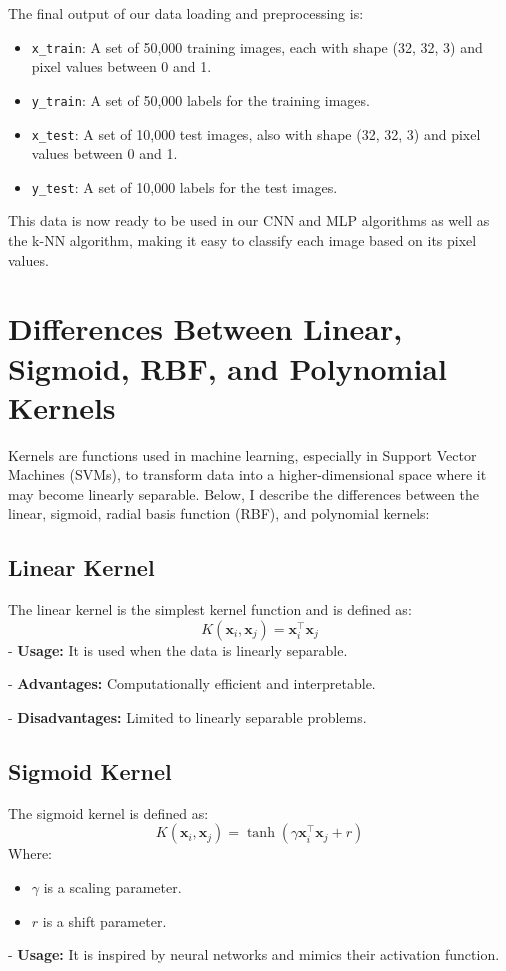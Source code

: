 \documentclass[lettersize,journal]{IEEEtran}
\begin{document}
The final output of our data loading and preprocessing is:
\begin{itemize}
    \item \texttt{x\_train}: A set of 50,000 training images, each with shape (32, 32, 3) and pixel values between 0 and 1.
    \item \texttt{y\_train}: A set of 50,000 labels for the training images.
    \item \texttt{x\_test}: A set of 10,000 test images, also with shape (32, 32, 3) and pixel values between 0 and 1.
    \item \texttt{y\_test}: A set of 10,000 labels for the test images.
\end{itemize}
\vspace{0.3cm}
This data is now ready to be used in our CNN and MLP algorithms as well as the k-NN algorithm, making it easy to classify each image based on its pixel values.

\section{\textbf{Differences Between Linear, Sigmoid, RBF, and Polynomial Kernels}}

Kernels are functions used in machine learning, especially in Support Vector Machines (SVMs), to transform data into a higher-dimensional space where it may become linearly separable. Below, I describe the differences between the linear, sigmoid, radial basis function (RBF), and polynomial kernels:

\subsection{\textbf{Linear Kernel}}
The linear kernel is the simplest kernel function and is defined as:
\[
K(\mathbf{x}_i, \mathbf{x}_j) = \mathbf{x}_i^\top \mathbf{x}_j
\]
- \textbf{Usage:} It is used when the data is linearly separable.

\vspace{0.1cm}

\hspace{-0.33cm}- \textbf{Advantages:} Computationally efficient and interpretable.

\vspace{0.1cm}

\hspace{-0.33cm}- \textbf{Disadvantages:} Limited to linearly separable problems.

\subsection{\textbf{Sigmoid Kernel}}
The sigmoid kernel is defined as:
\[
K(\mathbf{x}_i, \mathbf{x}_j) = \tanh(\gamma \mathbf{x}_i^\top \mathbf{x}_j + r)
\]
Where:
\begin{itemize}
    \item $\gamma$ is a scaling parameter.
    \item $r$ is a shift parameter.
\end{itemize}
- \textbf{Usage:} It is inspired by neural networks and mimics their activation function.
\end{document}
